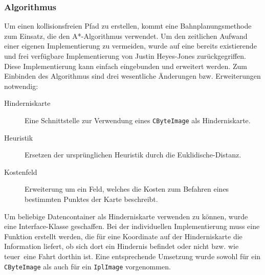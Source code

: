 \subsubsection{Algorithmus}
\authorsection{\editorjulian}
Um einen kollisionsfreien Pfad zu erstellen, kommt eine Bahnplanungsmethode zum Einsatz, die den A*-Algorithmus verwendet.
Um den zeitlichen Aufwand einer eigenen Implementierung zu vermeiden, wurde auf eine bereits existierende und frei verfügbare Implementierung von Justin Heyes-Jones\cite{jonesAstar} zurückgegriffen.
Diese Implementierung kann einfach eingebunden und erweitert werden.
Zum Einbinden des Algorithmus sind drei wesentliche Änderungen bzw.
Erweiterungen notwendig:
\begin{description}
	\item[Hinderniskarte] Eine Schnittstelle zur Verwendung eines \lstinline{CByteImage} als Hinderniskarte.
	\item[Heuristik] Ersetzen der ursprünglichen Heuristik durch die \gls{Euklidische-Distanz}.
	\item[Kostenfeld] Erweiterung um ein Feld, welches die Kosten zum Befahren eines bestimmten Punktes der Karte beschreibt.
\end{description}

Um beliebige Datencontainer als Hinderniskarte verwenden zu können, wurde eine Interface-Klasse geschaffen.
Bei der individuellen Implementierung muss eine Funktion erstellt werden, die für eine Koordinate auf der Hinderniskarte die Information liefert, ob sich dort ein Hindernis befindet oder nicht bzw. wie \glqq teuer\grqq\ eine Fahrt dorthin ist.
Eine entsprechende Umsetzung wurde sowohl für ein \lstinline{CByteImage} als auch für ein \lstinline{IplImage} vorgenommen.

